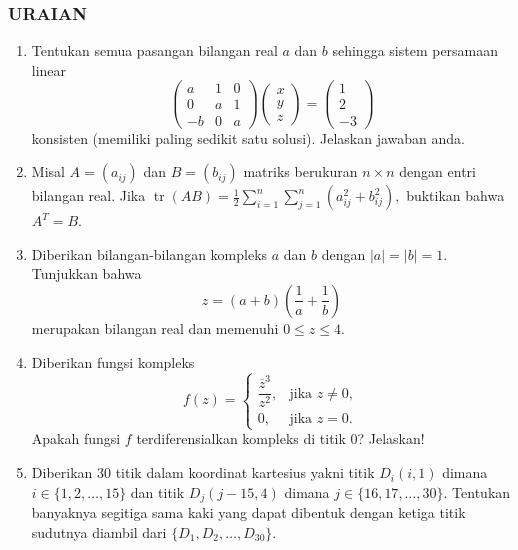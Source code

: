 \documentclass[12pt,twoside]{article}
\begin{document}
\subsubsection*{URAIAN}
\begin{enumerate}
	\item Tentukan semua pasangan bilangan real $a$ dan $b$ sehingga sistem persamaan linear
	      \[
		      \begin{pmatrix}
			      a  & 1 & 0 \\
			      0  & a & 1 \\
			      -b & 0 & a
		      \end{pmatrix}
		      \begin{pmatrix} x \\ y \\ z \end{pmatrix}
		      =
		      \begin{pmatrix} 1 \\ 2 \\ -3 \end{pmatrix}
	      \]
	      konsisten (memiliki paling sedikit satu solusi). Jelaskan jawaban anda.

	\item Misal $A = (a_{ij})$ dan $B = (b_{ij})$ matriks berukuran $n \times n$ dengan entri bilangan real. Jika
	      \(
	      \displaystyle\operatorname{tr}(AB) = \frac{1}{2} \sum_{i=1}^{n} \sum_{j=1}^{n} (a_{ij}^2 + b_{ij}^2),
	      \)
	      buktikan bahwa $A^T = B$.

	\item Diberikan bilangan-bilangan kompleks $a$ dan $b$ dengan $|a| = |b| = 1$. Tunjukkan bahwa
	      \[
		      z = (a+b) \left(\frac{1}{a} + \frac{1}{b} \right)
	      \]
	      merupakan bilangan real dan memenuhi $0 \leq z \leq 4$.

	\item Diberikan fungsi kompleks
	      \[
		      f(z) =
		      \begin{cases}
			      \dfrac{\overline{z}^3}{z^2}, & \text{jika } z \neq 0, \\
			      0,                           & \text{jika } z = 0.
		      \end{cases}
	      \]
	      Apakah fungsi $f$ terdiferensialkan kompleks di titik $0$? Jelaskan!

	\item Diberikan 30 titik dalam koordinat kartesius yakni titik $D_i(i,1)$ dimana $i \in \{1,2,\dots,15\}$ dan titik $D_j(j-15,4)$ dimana $j \in \{16,17,\dots,30\}$. Tentukan banyaknya segitiga sama kaki yang dapat dibentuk dengan ketiga titik sudutnya diambil dari $\{D_1, D_2, \dots, D_{30}\}$.
\end{enumerate}
\newpage
{}
\end{document}
